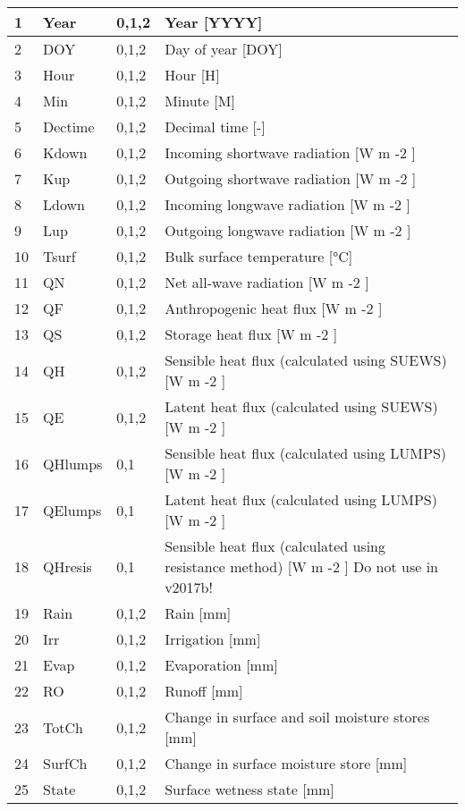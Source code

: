 \documentclass[letterpaper,10pt,english]{sphinxmanual}
\begin{document}
\begin{savenotes}
\begin{longtable}{|l|l|l|l|}
1
&
Year
&
0,1,2
&
Year {[}YYYY{]}
\\
\hline
2
&
DOY
&
0,1,2
&
Day of year {[}DOY{]}
\\
\hline
3
&
Hour
&
0,1,2
&
Hour {[}H{]}
\\
\hline
4
&
Min
&
0,1,2
&
Minute {[}M{]}
\\
\hline
5
&
Dectime
&
0,1,2
&
Decimal time {[}-{]}
\\
\hline
6
&
Kdown
&
0,1,2
&
Incoming shortwave radiation {[}W m -2 {]}
\\
\hline
7
&
Kup
&
0,1,2
&
Outgoing shortwave radiation {[}W m -2 {]}
\\
\hline
8
&
Ldown
&
0,1,2
&
Incoming longwave radiation {[}W m -2 {]}
\\
\hline
9
&
Lup
&
0,1,2
&
Outgoing longwave radiation {[}W m -2 {]}
\\
\hline
10
&
Tsurf
&
0,1,2
&
Bulk surface temperature {[}°C{]}
\\
\hline
11
&
QN
&
0,1,2
&
Net all-wave radiation {[}W m -2 {]}
\\
\hline
12
&
QF
&
0,1,2
&
Anthropogenic heat flux {[}W m -2 {]}
\\
\hline
13
&
QS
&
0,1,2
&
Storage heat flux {[}W m -2 {]}
\\
\hline
14
&
QH
&
0,1,2
&
Sensible heat flux (calculated using SUEWS) {[}W m -2 {]}
\\
\hline
15
&
QE
&
0,1,2
&
Latent heat flux (calculated using SUEWS) {[}W m -2 {]}
\\
\hline
16
&
QHlumps
&
0,1
&
Sensible heat flux (calculated using LUMPS) {[}W m -2 {]}
\\
\hline
17
&
QElumps
&
0,1
&
Latent heat flux (calculated using LUMPS) {[}W m -2 {]}
\\
\hline
18
&
QHresis
&
0,1
&
Sensible heat flux (calculated using resistance method) {[}W m -2 {]} Do not use in v2017b!
\\
\hline
19
&
Rain
&
0,1,2
&
Rain {[}mm{]}
\\
\hline
20
&
Irr
&
0,1,2
&
Irrigation {[}mm{]}
\\
\hline
21
&
Evap
&
0,1,2
&
Evaporation {[}mm{]}
\\
\hline
22
&
RO
&
0,1,2
&
Runoff {[}mm{]}
\\
\hline
23
&
TotCh
&
0,1,2
&
Change in surface and soil moisture stores {[}mm{]}
\\
\hline
24
&
SurfCh
&
0,1,2
&
Change in surface moisture store {[}mm{]}
\\
\hline
25
&
State
&
0,1,2
&
Surface wetness state {[}mm{]}

\end{longtable}
\end{savenotes}
\end{document}
